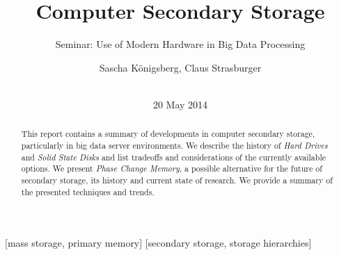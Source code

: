 \documentclass{acm_proc_article-sp}
\begin{document}
\title{Computer Secondary Storage}
\subtitle{Seminar: Use of Modern Hardware in Big Data Processing}

\author{
\alignauthor
Sascha K{\"o}nigsberg, Claus Strasburger\\
       \\
}

\date{20 May 2014}

\maketitle
\begin{abstract}
This report contains a summary of developments in computer secondary storage, particularly in big data server environments. We describe the history of \emph{Hard Drives} and \emph{Solid State Disks} and list tradeoffs and considerations of the currently available options. We present \emph{Phase Change Memory}, a possible alternative for the future of secondary storage, its history and current state of research. We provide a summary of the presented techniques and trends.%
\end{abstract}

[mass storage, primary memory]
[secondary storage, storage hierarchies]

\end{document}
